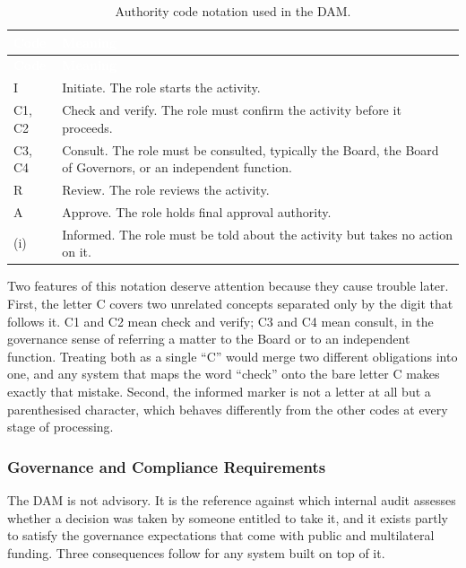\begin{longtable}{|p{}|p{}|}
\caption{Authority code notation used in the DAM.}\label{tab:codes}\\
\hline
\rowcolor{thesisgreen}\textcolor{white}{\textbf{Code}} & \textcolor{white}{\textbf{Meaning}} \\
\hline
\endfirsthead
\hline
\rowcolor{thesisgreen}\textcolor{white}{\textbf{Code}} & \textcolor{white}{\textbf{Meaning}} \\
\hline
\endhead
I & Initiate. The role starts the activity. \\ \hline
C1, C2 & Check and verify. The role must confirm the activity before it proceeds. \\ \hline
C3, C4 & Consult. The role must be consulted, typically the Board, the Board of Governors, or an independent function. \\ \hline
R & Review. The role reviews the activity. \\ \hline
A & Approve. The role holds final approval authority. \\ \hline
(i) & Informed. The role must be told about the activity but takes no action on it. \\ \hline
\end{longtable}

Two features of this notation deserve attention because they cause trouble later. First, the letter C covers two unrelated concepts separated only by the digit that follows it. C1 and C2 mean check and verify; C3 and C4 mean consult, in the governance sense of referring a matter to the Board or to an independent function. Treating both as a single ``C'' would merge two different obligations into one, and any system that maps the word ``check'' onto the bare letter C makes exactly that mistake. Second, the informed marker is not a letter at all but a parenthesised character, which behaves differently from the other codes at every stage of processing.

\subsubsection{Governance and Compliance Requirements}

The DAM is not advisory. It is the reference against which internal audit assesses whether a decision was taken by someone entitled to take it, and it exists partly to satisfy the governance expectations that come with public and multilateral funding. Three consequences follow for any system built on top of it.

